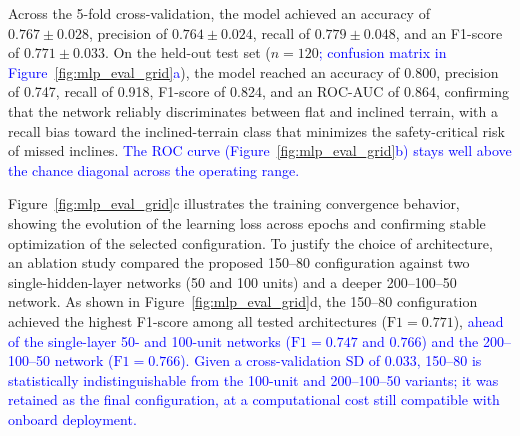 \documentclass[preprint,12pt]{elsarticle}
\newcommand{\revblue}[1]{\textcolor{blue}{#1}}
\begin{document}
Across the 5-fold cross-validation, the model achieved an accuracy of $0.767 \pm 0.028$, precision of $0.764 \pm 0.024$, recall of $0.779 \pm 0.048$, and an F1-score of $0.771 \pm 0.033$. On the held-out test set ($n = 120$\revblue{; confusion matrix in Figure~\ref{fig:mlp_eval_grid}a}), the model reached an accuracy of 0.800, precision of 0.747, recall of 0.918, F1-score of 0.824, and an ROC-AUC of 0.864, confirming that the network reliably discriminates between flat and inclined terrain, with a recall bias toward the inclined-terrain class that minimizes the safety-critical risk of missed inclines. \revblue{The ROC curve (Figure~\ref{fig:mlp_eval_grid}b) stays well above the chance diagonal across the operating range.}

Figure~\ref{fig:mlp_eval_grid}c illustrates the training convergence behavior, showing the evolution of the learning loss across epochs and confirming stable optimization of the selected configuration. To justify the choice of architecture, an ablation study compared the proposed 150--80 configuration against two single-hidden-layer networks (50 and 100 units) and a deeper 200--100--50 network. As shown in Figure~\ref{fig:mlp_eval_grid}d, the 150--80 configuration achieved the highest F1-score among all tested architectures ($\text{F1} = 0.771$), \revblue{ahead of the single-layer 50- and 100-unit networks ($\text{F1} = 0.747$ and $0.766$) and the 200--100--50 network ($\text{F1} = 0.766$). Given a cross-validation SD of $0.033$, 150--80 is statistically indistinguishable from the 100-unit and 200--100--50 variants; it was retained as the final configuration, at a computational cost still compatible with onboard deployment.}
\end{document}
